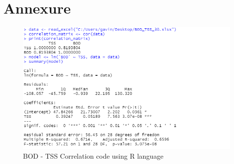 \newpage
\section*{\centering Annexure}





\begin{figure}[H]
\centering
\includegraphics[width=1\linewidth]{annexure/BOD_TSS_correlation.png}
\caption{BOD - TSS Correlation code using R language}
\label{fig:BOD_TSS_Correlation}
\end{figure}

